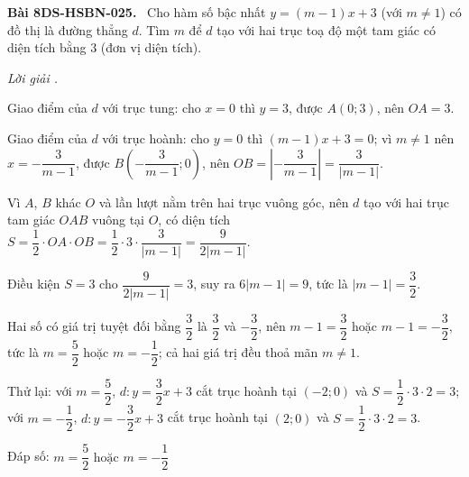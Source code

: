 \documentclass[12pt,a4paper]{article}
\newenvironment{problem}[1][]{\par\medskip\noindent\textbf{Bài #1.}\ }{\par}
\newenvironment{solution}[1][]{\par\noindent\textit{Lời giải #1.}\par}{\par}
\begin{document}
\begin{problem}[8DS-HSBN-025]
Cho hàm số bậc nhất $y = (m - 1)x + 3$ (với $m \neq 1$) có đồ thị là đường thẳng $d$. Tìm $m$ để $d$ tạo với hai trục toạ độ một tam giác có diện tích bằng $3$ (đơn vị diện tích).

\begin{solution}
Giao điểm của $d$ với trục tung: cho $x = 0$ thì $y = 3$, được $A(0; 3)$, nên $OA = 3$.

Giao điểm của $d$ với trục hoành: cho $y = 0$ thì $(m - 1)x + 3 = 0$; vì $m \neq 1$ nên $x = -\dfrac{3}{m - 1}$, được $B\left(-\dfrac{3}{m - 1}; 0\right)$, nên $OB = \left|-\dfrac{3}{m - 1}\right| = \dfrac{3}{|m - 1|}$.

Vì $A$, $B$ khác $O$ và lần lượt nằm trên hai trục vuông góc, nên $d$ tạo với hai trục tam giác $OAB$ vuông tại $O$, có diện tích $S = \dfrac{1}{2} \cdot OA \cdot OB = \dfrac{1}{2} \cdot 3 \cdot \dfrac{3}{|m - 1|} = \dfrac{9}{2|m - 1|}$.

Điều kiện $S = 3$ cho $\dfrac{9}{2|m - 1|} = 3$, suy ra $6|m - 1| = 9$, tức là $|m - 1| = \dfrac{3}{2}$.

Hai số có giá trị tuyệt đối bằng $\dfrac{3}{2}$ là $\dfrac{3}{2}$ và $-\dfrac{3}{2}$, nên $m - 1 = \dfrac{3}{2}$ hoặc $m - 1 = -\dfrac{3}{2}$, tức là $m = \dfrac{5}{2}$ hoặc $m = -\dfrac{1}{2}$; cả hai giá trị đều thoả mãn $m \neq 1$.

Thử lại: với $m = \dfrac{5}{2}$, $d\colon y = \dfrac{3}{2}x + 3$ cắt trục hoành tại $(-2; 0)$ và $S = \dfrac{1}{2} \cdot 3 \cdot 2 = 3$; với $m = -\dfrac{1}{2}$, $d\colon y = -\dfrac{3}{2}x + 3$ cắt trục hoành tại $(2; 0)$ và $S = \dfrac{1}{2} \cdot 3 \cdot 2 = 3$.

Đáp số: $\boxed{m = \dfrac{5}{2} \text{ hoặc } m = -\dfrac{1}{2}}$
\end{solution}
\end{problem}
\end{document}
